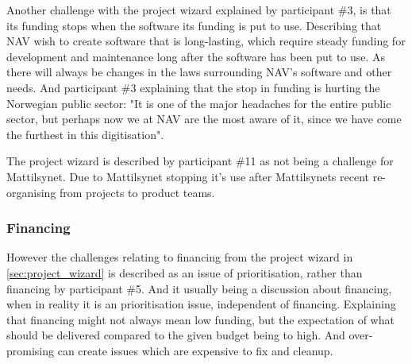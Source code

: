 Another challenge with the project wizard explained by participant \#3, is that its funding stops when the software its funding is put to use. Describing that NAV wish to create software that is long-lasting, which require steady funding for development and maintenance long after the software has been put to use. As there will always be changes in the laws surrounding NAV's software and other needs. And participant \#3 explaining that the stop in funding is hurting the Norwegian public sector: "It is one of the major headaches for the entire public sector, but perhaps now we at NAV are the most aware of it, since we have come the furthest in this digitisation".


The project wizard is described by participant \#11 as not being a challenge for Mattilsynet. Due to Mattilsynet stopping it's use after Mattilsynets recent re-organising from projects to product teams.

\subsubsection{Financing}
However the challenges relating to financing from the project wizard in \autoref{sec:project_wizard} is described as an issue of prioritisation, rather than financing by participant \#5. And it usually being a discussion about financing, when in reality it is an prioritisation issue, independent of financing. Explaining that financing might not always mean low funding, but the expectation of what should be delivered compared to the given budget being to high. And over-promising can create issues which are expensive to fix and cleanup.


